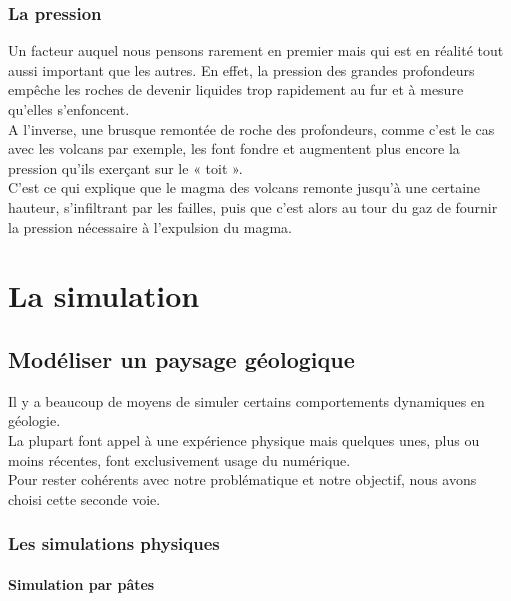 \documentclass[a4paper,11pt]{article}
\begin{document}
\subsubsection{La pression}

Un facteur auquel nous pensons rarement en premier mais qui est en réalité tout aussi important que les autres.
En effet, la pression des grandes profondeurs empêche les roches de devenir liquides trop rapidement au fur et à mesure qu'elles s'enfoncent.\\
A l'inverse, une brusque remontée de roche des profondeurs, comme c'est le cas avec les volcans par exemple, les font fondre et augmentent plus encore la pression qu'ils exerçant sur le « toit ».\\
C'est ce qui explique que le magma des volcans remonte jusqu'à une certaine hauteur, s'infiltrant par les failles, puis que c'est alors au tour du gaz de fournir la pression nécessaire à l'expulsion du magma.

\section{La simulation}

\subsection{Modéliser un paysage géologique}

Il y a beaucoup de moyens de simuler certains comportements dynamiques en géologie.\\
La plupart font appel à une expérience physique mais quelques unes, plus ou moins récentes, font exclusivement usage du numérique.\\
Pour rester cohérents avec notre problématique et notre objectif, nous avons choisi cette seconde voie.

\subsubsection{Les simulations physiques}

\paragraph{Simulation par pâtes}
\end{document}

